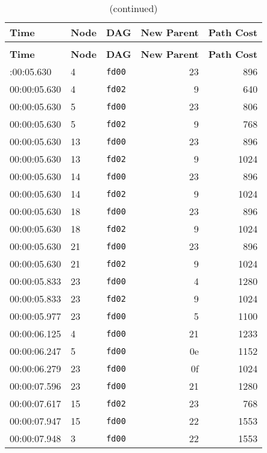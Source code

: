 \documentclass{article}
\begin{document}
\pagestyle{fancy}
\fancyhf{}
\begin{longtable}{lllrr}
\caption{Log of Preferred Parent Changes} \\
\toprule
\textbf{Time} & \textbf{Node} & \textbf{DAG} & \textbf{New Parent} & \textbf{Path Cost} \\
\midrule
\endfirsthead
\caption*{(continued)} \\
\toprule
\textbf{Time} & \textbf{Node} & \textbf{DAG} & \textbf{New Parent} & \textbf{Path Cost} \\
\midrule
\endhead
\bottomrule
\endfoot
00:00:05.630 & 4 & \texttt{fd00} & 23 & 896 \\
00:00:05.630 & 4 & \texttt{fd02} & 9 & 640 \\
00:00:05.630 & 5 & \texttt{fd00} & 23 & 806 \\
00:00:05.630 & 5 & \texttt{fd02} & 9 & 768 \\
00:00:05.630 & 13 & \texttt{fd00} & 23 & 896 \\
00:00:05.630 & 13 & \texttt{fd02} & 9 & 1024 \\
00:00:05.630 & 14 & \texttt{fd00} & 23 & 896 \\
00:00:05.630 & 14 & \texttt{fd02} & 9 & 1024 \\
00:00:05.630 & 18 & \texttt{fd00} & 23 & 896 \\
00:00:05.630 & 18 & \texttt{fd02} & 9 & 1024 \\
00:00:05.630 & 21 & \texttt{fd00} & 23 & 896 \\
00:00:05.630 & 21 & \texttt{fd02} & 9 & 1024 \\
00:00:05.833 & 23 & \texttt{fd00} & 4 & 1280 \\
00:00:05.833 & 23 & \texttt{fd02} & 9 & 1024 \\
00:00:05.977 & 23 & \texttt{fd00} & 5 & 1100 \\
00:00:06.125 & 4 & \texttt{fd00} & 21 & 1233 \\
00:00:06.247 & 5 & \texttt{fd00} & 0e & 1152 \\
00:00:06.279 & 23 & \texttt{fd00} & 0f & 1024 \\
00:00:07.596 & 23 & \texttt{fd00} & 21 & 1280 \\
00:00:07.617 & 15 & \texttt{fd02} & 23 & 768 \\
00:00:07.947 & 15 & \texttt{fd00} & 22 & 1553 \\
00:00:07.948 & 3 & \texttt{fd00} & 22 & 1553 \\

\end{longtable}
\end{document}
